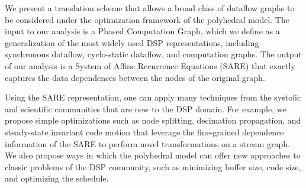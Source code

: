 We present a translation scheme that allows a broad class of dataflow
graphs to be considered under the optimization framework of the
polyhedral model.  The input to our analysis is a Phased Computation
Graph, which we define as a generalization of the most widely used DSP
representations, including synchronous dataflow, cyclo-static
dataflow, and computation graphs.  The output of our analysis is a
System of Affine Recurrence Equations (SARE) that exactly captures the
data dependences between the nodes of the original graph.

Using the SARE representation, one can apply many techniques from the
systolic and scientific communities that are new to the DSP domain.
For example, we propose simple optimizations such as node splitting,
decimation propagation, and steady-state invariant code motion that
leverage the fine-grained dependence information of the SARE to
perform novel transformations on a stream graph.  We also propose ways
in which the polyhedral model can offer new approaches to classic
problems of the DSP community, such as minimizing buffer size, code
size, and optimizing the schedule.